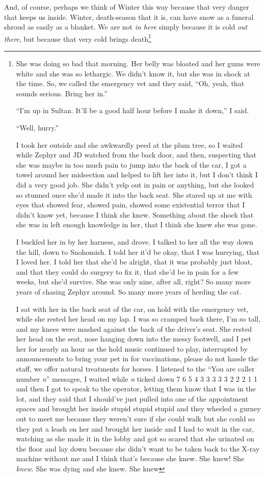 \documentclass[12pt,oneside]{memoir}
\begin{document}
And, of course, perhaps we think of Winter this way because that very danger that keeps us inside. Winter, death-season that it is, can have snow as a funeral shroud as easily as a blanket. We are not \emph{in here} simply because it is cold \emph{out there}, but because that very cold brings death\footnote{She was doing so bad that morning. Her belly was bloated and her gums were white and she was so lethargic. We didn't know it, but she was in shock at the time. So, we called the emergency vet and they said, ``Oh, yeah, that sounds serious. Bring her in.''\par
``I'm up in Sultan. It'll be a good half hour before I make it down,'' I said.\par
``Well, hurry.''\par
I took her outside and she awkwardly peed at the plum tree, so I waited while Zephyr and JD watched from the back door, and then, suspecting that she was maybe in too much pain to jump into the back of the car, I got a towel around her midsection and helped to lift her into it, but I don't think I did a very good job. She didn't yelp out in pain or anything, but she looked so stunned once she'd made it into the back seat. She stared up at me with eyes that showed fear, showed pain, showed some existential terror that I didn't know yet, because I think she knew. Something about the shock that she was in left enough knowledge in her, that I think she knew she was gone.\par
I buckled her in by her harness, and drove. I talked to her all the way down the hill, down to Snohomish. I told her it'd be okay, that I was hurrying, that I loved her. I told her that she'd be alright, that it was probably just bloat, and that they could do surgery to fix it, that she'd be in pain for a few weeks, but she'd survive. She was only nine, after all, right? So many more years of chasing Zephyr around. So many more years of herding the cat.\footnotemark\par
I sat with her in the back seat of the car, on hold with the emergency vet, while she rested her head on my lap. I was so cramped back there, I'm so tall, and my knees were mashed against the back of the driver's seat. She rested her head on the seat, nose hanging down into the messy footwell, and I pet her for nearly an hour as the hold music continued to play, interrupted by announcements to bring your pet in for vaccinations, please do not hassle the staff, we offer natural treatments for horses. I listened to the ``You are caller number \emph{n}'' messages, I waited while \emph{n} ticked down 7 6 5 4 3 3 3 3 3 2 2 2 1 1 and then I got to speak to the operator, letting them know that I was in the lot, and they said that I should've just pulled into one of the appointment spaces and brought her inside stupid stupid stupid and they wheeled a gurney out to meet me because they weren't sure if she could walk but she could so they put a leash on her and brought her inside and I had to wait in the car, watching as she made it in the lobby and got so scared that she urinated on the floor and lay down because she didn't want to be taken back to the X-ray machine without me and I think that's because she knew. She knew! She \emph{knew}. She was dying and she knew. She knew \par 
}
\end{document}
